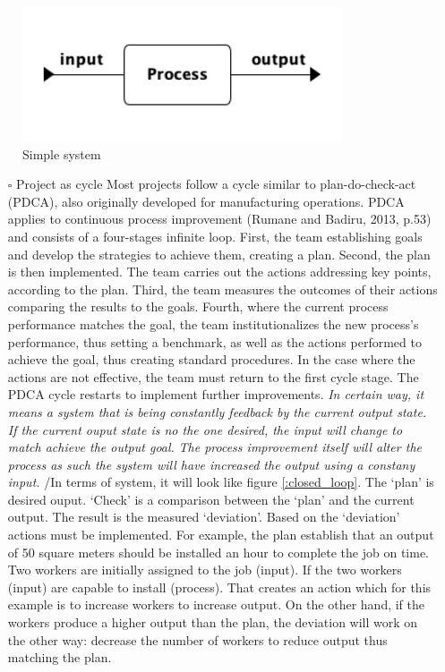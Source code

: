 \documentclass{article}
\begin{document}
\begin{figure}[htbp]
\centering
\includegraphics[height=150]{Figures/system_basic.png}
\caption{\label{fig:orgdfde06f}Simple system}
\end{figure}



\begin{itemize}
\item[{$\square$}] Project as cycle
Most projects follow a cycle similar to plan-do-check-act (PDCA), also originally developed for manufacturing operations.
PDCA applies to continuous process improvement (Rumane and Badiru, 2013, p.53) and consists of a four-stages infinite loop.
First, the team establishing goals and develop the strategies to achieve them, creating a plan.
Second, the plan is then implemented.
The team carries out the actions addressing key points, according to the plan.
Third, the team measures the outcomes of their actions comparing the results to the goals.
Fourth, where the current process performance matches the goal, the team institutionalizes the new process’s performance, thus setting a benchmark, as well as the actions performed to achieve the goal, thus creating standard procedures.
In the case where the actions are not effective, the team must return to the first cycle stage.
The PDCA cycle restarts to implement further improvements.
\emph{In certain way, it means a system that is being constantly feedback by the current output state.}
\emph{If the current ouput state is no the one desired, the input will change to match achieve the output goal.}
\emph{The process improvement itself will alter the process as such the system will have increased the output using a constany input.}
/In terms of system, it will look like figure \ref{:closed_loop}.
The `plan' is desired ouput.
`Check' is a comparison between the `plan' and the current output.
The result is the measured `deviation'.
Based on the `deviation' actions must be implemented.
For example, the plan establish that an output of 50 square meters should be installed an hour to complete the job on time.
Two workers are initially assigned to the job (input).
If the two workers (input) are capable to install (process). 
That creates an action which for this example is to increase workers to increase output.
On the other hand, if the workers produce a higher output than the plan, the deviation will work on the other way: decrease the number of workers to reduce output thus matching the plan.
\end{itemize}
\end{document}
